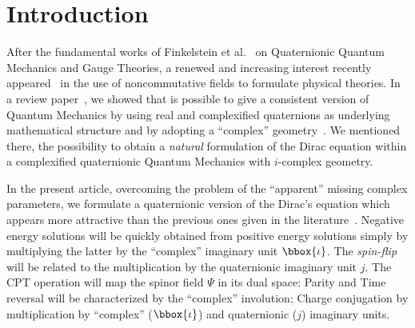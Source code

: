 

\begin{abstract}

We perform a one-dimensional complexified quaternionic version of the Dirac 
equation based on $i$-complex geometry. The 
problem of the missing complex parameters in Quaternionic Quantum Mechanics 
with $i$-complex geometry is overcome by a nice ``trick''  which allows 
to avoid the Dirac algebra constraints in formulating our relativistic
equation. A brief comparison with other quaternionic formulations is also 
presented.

\end{abstract}




\section{Introduction}
\label{s1}


After the fundamental works of Finkelstein et al.~\cite{FIN} on Quaternionic 
Quantum Mechanics and Gauge Theories, a renewed and increasing interest 
recently appeared~\cite{AD,QM} in the use of noncommutative fields to 
formulate physical theories. In a review paper~\cite{DR}, 
we showed that is possible to give a consistent version of 
Quantum Mechanics by using real and complexified quaternions
as underlying mathematical structure and by adopting a ``complex'' 
geometry~\cite{REM,HB}. We mentioned there, the possibility to 
obtain a {\em natural} formulation of the Dirac equation within a 
complexified quaternionic Quantum Mechanics with $i$-complex geometry. 


In the present article, overcoming the problem of the ``apparent'' missing
complex parameters,  we formulate a quaternionic 
version of the Dirac's equation which appears more attractive than the 
previous ones given in the literature~\cite{R,D}. 
Negative energy solutions will 
be quickly obtained from positive energy 
solutions simply by multiplying the latter by the ``complex'' imaginary unit
$\bbox{\iota}$. The {\em spin-flip} will be related to the 
multiplication by the quaternionic imaginary unit $j$. The CPT operation
will map the spinor field $\Psi$ in its dual space: 
Parity and Time reversal will be characterized  
by the ``complex'' involution; Charge conjugation by 
multiplication by ``complex'' ($\bbox{\iota}$) and 
quaternionic ($j$) imaginary units.

